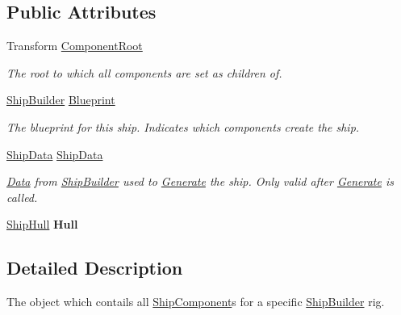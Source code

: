 \subsection*{Public Attributes}
\begin{DoxyCompactItemize}
\item 
Transform \hyperlink{class_skyrates_1_1_client_1_1_ship_1_1_ship_a2c9f15ba4d40bfae0e0dd3c7958d4f22}{Component\-Root}
\begin{DoxyCompactList}\small\item\em The root to which all components are set as children of. \end{DoxyCompactList}\item 
\hyperlink{class_skyrates_1_1_client_1_1_ship_1_1_ship_builder}{Ship\-Builder} \hyperlink{class_skyrates_1_1_client_1_1_ship_1_1_ship_a698461079579d1847c9d8a4fb4688da0}{Blueprint}
\begin{DoxyCompactList}\small\item\em The blueprint for this ship. Indicates which components create the ship. \end{DoxyCompactList}\item 
\hyperlink{class_ship_data}{Ship\-Data} \hyperlink{class_skyrates_1_1_client_1_1_ship_1_1_ship_a34acbbe72da92209ca8a2239b5819553}{Ship\-Data}
\begin{DoxyCompactList}\small\item\em \hyperlink{namespace_skyrates_1_1_client_1_1_data}{Data} from \hyperlink{class_skyrates_1_1_client_1_1_ship_1_1_ship_builder}{Ship\-Builder} used to \hyperlink{class_skyrates_1_1_client_1_1_ship_1_1_ship_a3a126b748f8c3265ab2d054c8c11ded7}{Generate} the ship. Only valid after \hyperlink{class_skyrates_1_1_client_1_1_ship_1_1_ship_a3a126b748f8c3265ab2d054c8c11ded7}{Generate} is called. \end{DoxyCompactList}\item 
\hypertarget{class_skyrates_1_1_client_1_1_ship_1_1_ship_a34e93f902393de4e6afb24455d1cb7f6}{\hyperlink{class_skyrates_1_1_client_1_1_ship_1_1_ship_hull}{Ship\-Hull} {\bfseries Hull}}\label{class_skyrates_1_1_client_1_1_ship_1_1_ship_a34e93f902393de4e6afb24455d1cb7f6}

\end{DoxyCompactItemize}


\subsection{Detailed Description}
The object which contails all \hyperlink{class_skyrates_1_1_client_1_1_ship_1_1_ship_component}{Ship\-Component}s for a specific \hyperlink{class_skyrates_1_1_client_1_1_ship_1_1_ship_builder}{Ship\-Builder} rig. 



